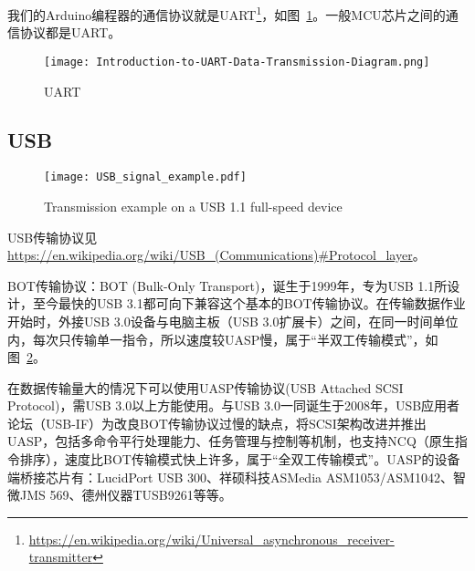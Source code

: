我们的Arduino编程器的通信协议就是UART\footnote{\url{https://en.wikipedia.org/wiki/Universal_asynchronous_receiver-transmitter}}，如图~\ref{fig:UART}。一般MCU芯片之间的通信协议都是UART。

\begin{figure}[htbp]
    \centering
    \texttt{[image: Introduction-to-UART-Data-Transmission-Diagram.png]}
    \caption{UART}
    \label{fig:UART}
\end{figure}

\subsection{USB}


\begin{figure}[htbp]
    \centering
    \texttt{[image: USB\_signal\_example.pdf]}
    \caption{Transmission example on a USB 1.1 full-speed device}
    \label{fig:USB-Transmission}
\end{figure}

USB传输协议见\url{https://en.wikipedia.org/wiki/USB_(Communications)#Protocol_layer}。

BOT传输协议：BOT (Bulk-Only Transport)，诞生于1999年，专为USB 1.1所设计，至今最快的USB 3.1都可向下兼容这个基本的BOT传输协议。在传输数据作业开始时，外接USB 3.0设备与电脑主板（USB 3.0扩展卡）之间，在同一时间单位内，每次只传输单一指令，所以速度较UASP慢，属于“半双工传输模式”，如图~\ref{fig:USB-Transmission}。

在数据传输量大的情况下可以使用UASP传输协议(USB Attached SCSI Protocol)，需USB 3.0以上方能使用。与USB 3.0一同诞生于2008年，USB应用者论坛（USB-IF）为改良BOT传输协议过慢的缺点，将SCSI架构改进并推出UASP，包括多命令平行处理能力、任务管理与控制等机制，也支持NCQ（原生指令排序），速度比BOT传输模式快上许多，属于“全双工传输模式”。UASP的设备端桥接芯片有：LucidPort USB 300、祥硕科技ASMedia ASM1053/ASM1042、智微JMS 569、德州仪器TUSB9261等等。



